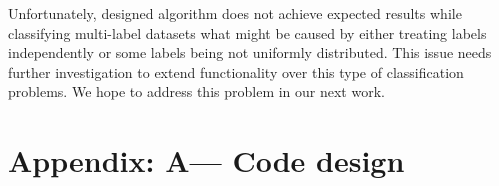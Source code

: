 \documentclass[12pt, a4paper, pdflatex]{report}
\begin{document}
Unfortunately, designed algorithm does not achieve expected results while classifying multi-label datasets what might be caused by either treating labels independently or some labels being not uniformly distributed. This issue needs further investigation to extend functionality over this type of classification problems. We hope to address this problem in our next work.\\


\clearpage
\newpage
\section*{Appendix: A--- Code design\label{ap:code}}




{}
\end{document}
